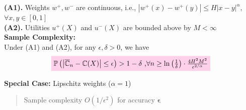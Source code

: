 \documentclass{beamer}
\begin{document}
\begin{frame}{	}

\vspace{3ex}

\begin{small}

{\textbf{(A1).}  Weights $w^+, w^-$ are \holder continuous, i.e., $| w^+(x) - w^+(y) | \leq H | x-y |^{\alpha}$, $\forall x,y \in [0,1]$}\\[2ex]
{\textbf{(A2).}  Utilities $u^+(X)$ and $u^-(X)$ are bounded above by $M<\infty$}\\[4ex]

{\color{blue}\textbf{Sample Complexity:}}\\[1ex]
Under (A1) and (A2), for any $\epsilon, \delta >0$, we have
\begin{align*}
\tikz[baseline]{
            \node[fill=pink!20,anchor=base] (t1)
            {
$\Prob{\left |\overline \C_n- \C(X) \right| \leq  \epsilon } >1- \delta\text{     ,} \forall n \geq \ln\left(\frac{1}{\delta}\right)\cdot 
\frac{4H^2 M^2}{\epsilon^{2/\alpha}}$};}
\end{align*}

\vspace{3ex}
\pause

{\color{darkgreen}\textbf{Special Case:}} Lipschitz weights ($\alpha=1$) \\[1ex]
\begin{quote}
Sample complexity \alert{$O\left(1/\epsilon^2\right)$} for accuracy {\color{upmaroon} $\bm{\epsilon}$}
\end{quote}
\end{small}
\end{frame}


\end{document}
